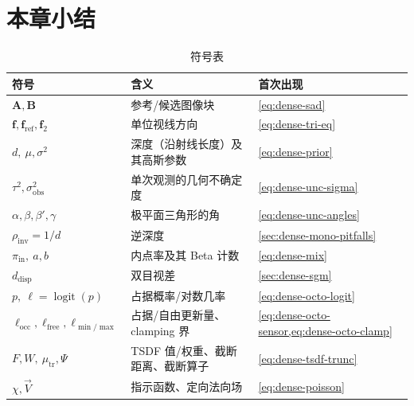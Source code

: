 \section*{本章小结}

\begin{table}[H]\centering\small
\caption{符号表}
\begin{tabular}{lll}
\toprule
符号 & 含义 & 首次出现 \\
\midrule
$\mathbf{A},\mathbf{B}$ & 参考/候选图像块 & \cref{eq:dense-sad} \\
$\mathbf{f},\mathbf{f}_{\mathrm{ref}},\mathbf{f}_2$ & 单位视线方向 & \cref{eq:dense-tri-eq} \\
$d,\ \mu,\sigma^2$ & 深度（沿射线长度）及其高斯参数 & \cref{eq:dense-prior} \\
$\tau^2,\sigma_{\mathrm{obs}}^2$ & 单次观测的几何不确定度 & \cref{eq:dense-unc-sigma} \\
$\alpha,\beta,\beta',\gamma$ & 极平面三角形的角 & \cref{eq:dense-unc-angles} \\
$\rho_{\mathrm{inv}}=1/d$ & 逆深度 & \cref{sec:dense-mono-pitfalls} \\
$\pi_{\mathrm{in}},\ a,b$ & 内点率及其 Beta 计数 & \cref{eq:dense-mix} \\
$d_{\mathrm{disp}}$ & 双目视差 & \cref{sec:dense-sgm} \\
$p,\ \ell=\operatorname{logit}(p)$ & 占据概率/对数几率 & \cref{eq:dense-octo-logit} \\
$\ell_{\mathrm{occ}},\ell_{\mathrm{free}},\ell_{\min/\max}$ & 占据/自由更新量、clamping 界 & \cref{eq:dense-octo-sensor,eq:dense-octo-clamp} \\
$F,W,\ \mu_{\mathrm{tr}},\Psi$ & TSDF 值/权重、截断距离、截断算子 & \cref{eq:dense-tsdf-trunc} \\
$\chi,\vec{V}$ & 指示函数、定向法向场 & \cref{eq:dense-poisson} \\
\bottomrule
\end{tabular}
\end{table}

